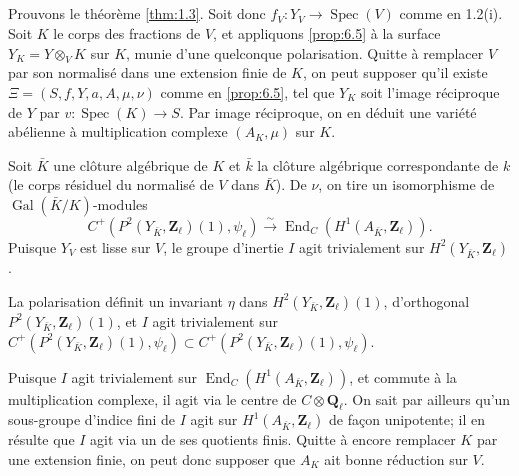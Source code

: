 \documentclass[11pt]{amsart}
\theoremstyle{plain}
\theoremstyle{definition}
\theoremstyle{remark}
\begin{document}
\subsection*{}
Prouvons le th\'eor\`eme \ref{thm:1.3}. Soit donc $f_V\colon Y_V\to\operatorname{Spec}(V)$ comme en 1.2(i). Soit $K$ le corps des fractions de $V$, et appliquons \ref{prop:6.5} \`a la surface $Y_K=Y\otimes_VK$ sur $K$, munie d'une quelconque polarisation. Quitte \`a remplacer $V$ par son normalis\'e dans une extension finie de $K$, on peut supposer qu'il existe $\Xi=(S,f,Y,a,A,\mu,\nu)$ comme en \ref{prop:6.5}, tel que $Y_K$ soit l'image r\'eciproque de $Y$ par $v\colon\operatorname{Spec}(K)\to S$. Par image r\'eciproque, on en d\'eduit une vari\'et\'e ab\'elienne \`a multiplication complexe $(A_K,\mu)$ sur $K$.

Soit $\bar{K}$ une cl\^oture alg\'ebrique de $K$ et $\bar{k}$ la cl\^oture alg\'ebrique correspondante de $k$ (le corps r\'esiduel du normalis\'e de $V$ dans $\bar{K}$). De $\nu$, on tire un isomorphisme de $\operatorname{Gal}(\bar{K}/K)$-modules
\begin{equation}\label{eq:6.6.1}
C^+(P^2(Y_{\bar{K}},\mathbf{Z}_\ell)(1),\psi_\ell)\xrightarrow{\sim}\operatorname{End}_C(H^1(A_{\bar{K}},\mathbf{Z}_\ell)).
\end{equation}
Puisque $Y_V$ est lisse sur $V$, le groupe d'inertie $I$ agit trivialement sur $H^2(Y_{\bar{K}},\mathbf{Z}_\ell)$.

La polarisation d\'efinit un invariant $\eta$ dans $H^2(Y_{\bar{K}},\mathbf{Z}_\ell)(1)$, d'orthogonal $P^2(Y_{\bar{K}},\mathbf{Z}_\ell)(1)$, et $I$ agit trivialement sur $C^+(P^2(Y_{\bar{K}},\mathbf{Z}_\ell)(1),\psi_\ell)\subset C^+(P^2(Y_{\bar{K}},\mathbf{Z}_\ell)(1),\psi_\ell)$.

Puisque $I$ agit trivialement sur $\operatorname{End}_C(H^1(A_{\bar{K}},\mathbf{Z}_\ell))$, et commute \`a la multiplication complexe, il agit via le centre de $C\otimes\mathbf{Q}_\ell$. On sait par ailleurs qu'un sous-groupe d'indice fini de $I$ agit sur $H^1(A_{\bar{K}},\mathbf{Z}_\ell)$ de fa\c{c}on unipotente; il en r\'esulte que $I$ agit via un de ses quotients finis. Quitte \`a encore remplacer $K$ par une extension finie, on peut donc supposer que $A_K$ ait bonne r\'eduction sur $V$.
\end{document}
